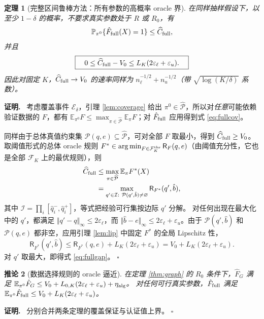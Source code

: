 \documentclass[11pt,a4paper]{ctexart}
\newtheorem{theorem}{定理}[section]
\newtheorem{corollary}[theorem]{推论}
\theoremstyle{definition}
\newenvironment{proofcn}{\par\noindent\textbf{证明.}\ }{\hfill$\square$\par}
\newcommand{\calP}{\mathcal P}
\newcommand{\calF}{\mathcal F}
\newcommand{\Rsk}{\mathsf R}
\newcommand{\Pp}{\mathbb P}
\newcommand{\Ee}{\mathbb E}
\newcommand{\epsl}{\varepsilon_{\ell}}
\newcommand{\epsu}{\varepsilon_u}
\newcommand{\hC}{\widehat C}
\begin{document}
\begin{theorem}[完整区间鲁棒方法：所有参数的高概率 oracle 界]\label{thm:full}
在同样抽样假设下，以至少 $1-\delta$ 的概率，\emph{不要求}真实参数处于 $R$ 或 $R_0$，有
\begin{equation}\label{eq:fullcov}
\Pp_{\pi^0}\{\hat F_{\rm full}(X)=1\}\le\hC_{\rm full},
\end{equation}
并且
\begin{equation}\label{eq:fullgap}
\boxed{\quad 0\le\hC_{\rm full}-V_0\le L_K(2\epsl+\epsu).\quad}
\end{equation}
因此对固定 $K$，$\hC_{\rm full}\to V_0$ 的速率同样为 $n_\ell^{-1/2}+n_u^{-1/2}$（带 $\sqrt{\log(K/\delta)}$ 系数）。
\end{theorem}
\begin{proofcn}
考虑覆盖事件 $\mathcal E_\delta$，引理 \ref{lem:coverage} 给出 $\pi^0\in\widehat{\calP}$，所以对\emph{任意}可能依赖验证数据的 $F$，都有 $\Ee_{\pi^0}F\le\max_{\pi\in\widehat{\calP}}\Ee_\pi F$；对 $\hat F_{\rm full}$ 应用得到式 \eqref{eq:fullcov}。

同样由于总体真值约束集 $\calP(q,e)\subseteq\widehat{\calP}$，可对全部 $F$ 取最小，得到 $\hC_{\rm full}\ge V_0$。取阈值形式的总体 oracle 规则 $F^*\in\arg\min_{F\in\calF_K^{\rm thr}}\Rsk_F(q,e)$（由阈值充分性，它也是全部 $\calF_K$ 上的最优规则），则
\begin{align*}
\hC_{\rm full}&\le\max_{\pi\in\widehat{\calP}}\Ee_\pi F^*(X)\\
&=\max_{q'\in\mathcal I:\ \calP(q',\hat b)\ne\varnothing}\Rsk_{F^*}(q',\hat b),
\end{align*}
其中 $\mathcal I=\prod_i[\hat q_i^-,\hat q_i^+]$，等式把经验可行集按边际 $q'$ 分解。
对任何出现在最大化中的 $q'$，都满足 $\Vert q'-q\Vert_\infty\le2\epsl$，而 $\Vert\hat b-e\Vert_\infty\le2\epsl+\epsu$。由于 $\calP(q',\hat b)$ 和 $\calP(q,e)$ 都非空，应用引理 \ref{lem:lip} 中固定 $F^*$ 的全局 Lipschitz 性，
\[
\Rsk_{F^*}(q',\hat b)\le\Rsk_{F^*}(q,e)+L_K(2\epsl+\epsu)
=V_0+L_K(2\epsl+\epsu).
\]
对 $q'$ 取最大，即得式 \eqref{eq:fullgap}。
\end{proofcn}

\begin{corollary}[数据选择规则的 oracle 逼近]\label{cor:sel}
在定理 \ref{thm:graph} 的 $R_0$ 条件下，$\hat F_G$ 满足
$\Ee_{\pi^0}\hat F_G\le V_0+L_{0,K}(2\epsl+\epsu)+\eta_{\rm alg}$。
对任何可行真实参数，$\hat F_{\rm full}$ 满足
$\Ee_{\pi^0}\hat F_{\rm full}\le V_0+L_K(2\epsl+\epsu)$。
\end{corollary}
\begin{proofcn}
分别合并两条定理的覆盖保证与认证值上界。
\end{proofcn}
\end{document}
